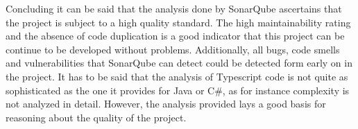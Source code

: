 Concluding it can be said that the analysis done by SonarQube ascertains that the project is subject to a high quality standard. The high maintainability rating and the absence of code duplication is a good indicator that this project can be continue to be developed without problems. Additionally, all bugs, code smells and vulnerabilities that SonarQube can detect could be detected form early on in the project. It has to be said that the analysis of Typescript code is not quite as sophisticated as the one it provides for Java or C\#, as for instance complexity is not analyzed in detail. However, the analysis provided lays a good basis for reasoning about the quality of the project.  
